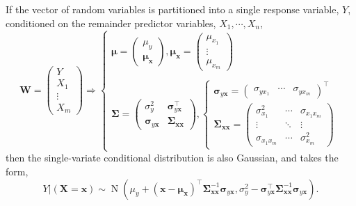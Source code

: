 \documentclass[12pt, twoside, draft]{article}
\begin{document}
If the vector of random variables is partitioned into a single response variable, $Y$, conditioned on the remainder predictor variables, $X_1, \cdots, X_n$,
\begin{equation}
\mathbf{W} = \begin{pmatrix} Y \\ X_1 \\ \vdots \\ X_m \end{pmatrix} \Rightarrow
\begin{cases}
\boldsymbol{\mu} = \begin{pmatrix} \mu_y \\ \boldsymbol{\mu}_{\mathbf{x}} \end{pmatrix},  \boldsymbol{\mu}_{\mathbf{x}} = \begin{pmatrix} \mu_{x_1} \\ \vdots \\ \mu_{x_m} \end{pmatrix}\\ \\
\boldsymbol{\Sigma} = \begin{pmatrix} \sigma^2_y & \boldsymbol{\sigma}^\top_{y\mathbf{x}} \\ \boldsymbol{\sigma}_{y\mathbf{x}} & \boldsymbol{\Sigma}_{\mathbf{x}\mathbf{x}} \end{pmatrix},
\begin{cases}
\boldsymbol{\sigma}_{y\mathbf{x}} = \begin{pmatrix} \sigma_{yx_1} & \cdots & \sigma_{yx_m} \end{pmatrix}^\top \\
\boldsymbol{\Sigma}_{\mathbf{x}\mathbf{x}} = 
\begin{pmatrix}
\sigma^2_{x_1} & \cdots & \sigma_{x_1 x_m} \\
\vdots & \ddots & \vdots \\
\sigma_{x_1 x_m} & \cdots & \sigma^2_{x_m}
\end{pmatrix}
\end{cases}
\end{cases}
\end{equation}
then the single-variate conditional distribution is also Gaussian, and takes the form, 
\begin{equation}
Y| (\mathbf{X} = \mathbf{x}) \sim \operatorname{N}\left(\mu_y + (\mathbf{x} - \boldsymbol{\mu}_{\mathbf{x}})^\top \boldsymbol{\Sigma}_{\mathbf{x} \mathbf{x}}^{-1} \boldsymbol{\sigma}_{y\mathbf{x}}, \sigma^2_y - \boldsymbol{\sigma}_{y\mathbf{x}}^\top \boldsymbol{\Sigma}_{\mathbf{x} \mathbf{x}}^{-1} \boldsymbol{\sigma}_{y \mathbf{x}} \right).
\end{equation}
\end{document}
